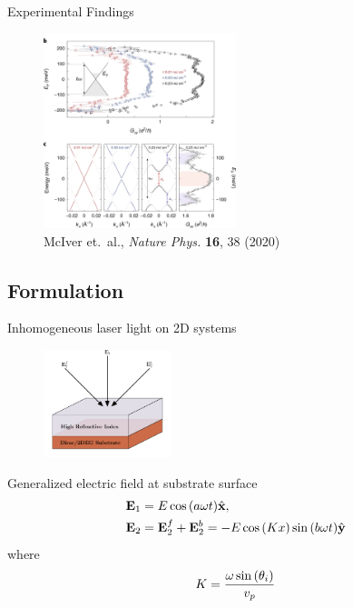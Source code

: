 \documentclass[xcolor=dvipsnames,10pt,aspectratio=169]{beamer}
\let\oldhat\hat
\renewcommand{\hat}[1]{\oldhat{\mathbf{#1}}}
\renewcommand{\vec}[1]{\mathbf{#1}}
\newcommand{\FO}{Formulation}
\begin{document}
  \begin{frame}{Experimental Findings}
    \begin{figure}
      \includegraphics[width=0.5\textwidth]{./figures/fqahe-dirac.png}
      \caption*{\footnotesize McIver et.\ al., \textit{Nature Phys.} \textbf{16}, 38 (2020)}
    \end{figure}
  \end{frame}

  \subsection{\FO}

  \begin{frame}{Inhomogeneous laser light on 2D systems}
    \begin{figure}
      \includegraphics[width=0.33\textwidth]{./figures/fll-setup.pdf}
    \end{figure}
    Generalized electric field at substrate surface
    \begin{align*}
      \small
      \vec{E}_1 &= E\cos{(a\omega t)} \hat{x},\\
      \vec{E}_2 &= \vec{E}_2^f + \vec{E}_2^b = -E\cos{(Kx)}\sin{(b\omega t)} \hat{y}
    \end{align*}
    where
    \begin{equation}
      \small
      K = \frac{\omega \sin{(\theta_i)}}{v_p}
    \end{equation}

  \end{frame}
\end{document}
